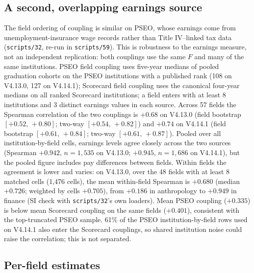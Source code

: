 \documentclass[11pt]{article}
\newcommand{\ci}[2]{$[#1,\allowbreak\,#2]$}
\newcommand{\scr}[1]{\texttt{scripts/#1}}
\begin{document}
\subsection{A second, overlapping earnings source}\label{sec:crosssource}

The field ordering of coupling is similar on PSEO, whose earnings come from unemployment-insurance wage records
rather than Title IV--linked tax data (\scr{32}, re-run in \scr{59}). This is robustness to the earnings
measure, not an independent replication: both couplings use the same $F$ and many of the same institutions. PSEO field coupling uses five-year medians of
pooled graduation cohorts on the PSEO institutions with a published rank (108 on V4.13.0, 127 on V4.14.1); Scorecard field coupling
uses the canonical four-year medians on all ranked Scorecard institutions; a field enters with at least 8
institutions and 3 distinct earnings values in each source. Across 57 fields the Spearman correlation of the two
couplings is $+0.68$ on V4.13.0 (field bootstrap \ci{+0.52}{+0.80}; two-way \ci{+0.54}{+0.82}) and $+0.74$ on V4.14.1 (field
bootstrap \ci{+0.61}{+0.84}; two-way \ci{+0.61}{+0.87}). Pooled over all institution-by-field cells, earnings
levels agree closely across the two sources (Spearman $+0.942$, $n=1{,}535$ on V4.13.0; $+0.945$, $n=1{,}686$ on
V4.14.1), but the pooled figure includes pay differences between fields. Within fields the agreement is lower
and varies: on V4.13.0, over the 48 fields with at least 8 matched cells (1,476 cells), the mean within-field
Spearman is $+0.680$ (median $+0.726$; weighted by cells $+0.705$), from $+0.186$ in anthropology to $+0.949$ in
finance (SI check with \scr{32}'s own loaders). Mean PSEO coupling ($+0.335$) is below
mean Scorecard coupling on the same fields ($+0.401$), consistent with the top-truncated PSEO sample. 61\% of the PSEO
institution-by-field rows used on V4.14.1 also enter the Scorecard couplings, so shared institution noise could raise
the correlation; this is not separated.

\subsection{Per-field estimates}\label{sec:fieldtable}
\end{document}
